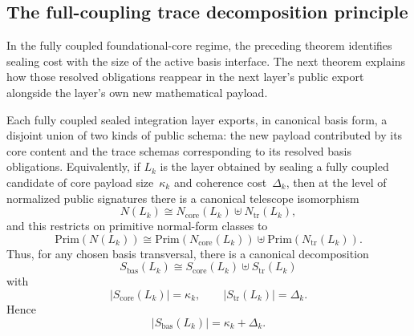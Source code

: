 \documentclass{lmcs}
\newcommand{\Prim}{\mathrm{Prim}}
\begin{document}
\subsection{The full-coupling trace decomposition principle}

In the fully coupled foundational-core regime, the preceding theorem identifies sealing cost with the size of the active basis interface. The next theorem explains how those resolved obligations reappear in the next layer's public export alongside the layer's own new mathematical payload.

\begin{thm}
\label{thm:trace}
Each fully coupled sealed integration layer exports, in canonical basis form,
a disjoint union of two kinds of public schema: the new payload contributed by
its core content and the trace schemas corresponding to its resolved basis
obligations. Equivalently, if $L_k$ is the layer obtained by sealing a fully
coupled candidate of core payload size~$\kappa_k$ and coherence
cost~$\Delta_k$, then at the level of normalized public signatures there is a
canonical telescope isomorphism
\[
  N(L_k) \cong N_{\mathrm{core}}(L_k) \uplus N_{\mathrm{tr}}(L_k),
\]
and this restricts on primitive normal-form classes to
\[
  \Prim(N(L_k))
  \cong
  \Prim(N_{\mathrm{core}}(L_k))
  \uplus
  \Prim(N_{\mathrm{tr}}(L_k)).
\]
Thus, for any chosen basis transversal, there is a canonical decomposition
\[
  S_{\mathrm{bas}}(L_k) \cong S_{\mathrm{core}}(L_k) \uplus S_{\mathrm{tr}}(L_k)
\]
with
\[
  |S_{\mathrm{core}}(L_k)| = \kappa_k,
  \qquad
  |S_{\mathrm{tr}}(L_k)| = \Delta_k.
\]
Hence
\[
  |S_{\mathrm{bas}}(L_k)| = \kappa_k + \Delta_k.
\]
\end{thm}
\end{document}
